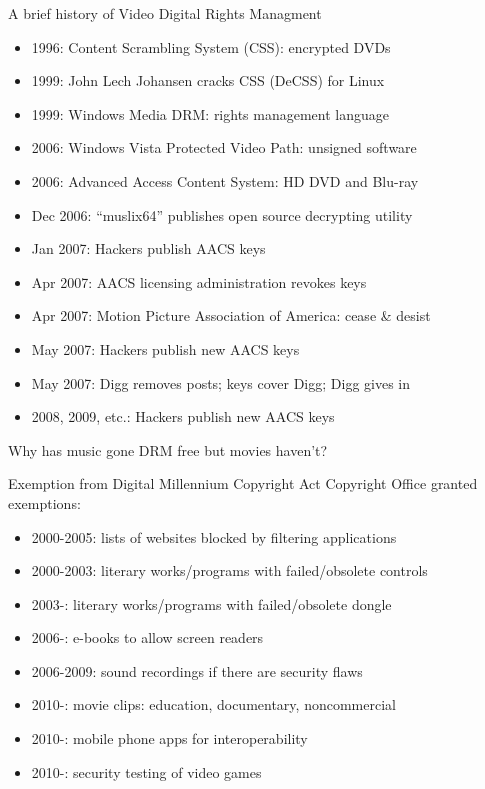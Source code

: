 \documentclass{beamer}
\begin{document}
\begin{frame}{A brief history of Video Digital Rights Managment}
\begin{itemize}
\item 1996: Content Scrambling System (CSS): encrypted DVDs
\item 1999: John Lech Johansen cracks CSS (DeCSS) for Linux
\item 1999: Windows Media DRM: rights management language
\item 2006: Windows Vista Protected Video Path: unsigned software
\item 2006: Advanced Access Content System: HD DVD and Blu-ray
\item Dec 2006: ``muslix64'' publishes open source decrypting utility
\item Jan 2007: Hackers publish AACS keys
\item Apr 2007: AACS licensing administration revokes keys
\item Apr 2007: Motion Picture Association of America: cease \& desist
\item May 2007: Hackers publish new AACS keys 
\item May 2007: Digg removes posts; keys cover Digg; Digg gives in
\item 2008, 2009, etc.: Hackers publish new AACS keys
\end{itemize}
\pause
\begin{center}
Why has music gone DRM free but movies haven't?
\end{center}
\end{frame}

\begin{frame}{Exemption from Digital Millennium Copyright Act}
Copyright Office granted exemptions:
\begin{itemize}
\item 2000-2005: lists of websites blocked by filtering applications
\item 2000-2003: literary works/programs with failed/obsolete controls
\item 2003-\the\year: literary works/programs with failed/obsolete dongle
\item 2006-\the\year: e-books to allow screen readers
\item 2006-2009: sound recordings if there are security flaws
\item 2010-\the\year: movie clips: education, documentary, noncommercial
\item 2010-\the\year: mobile phone apps for interoperability
\item 2010-\the\year: security testing of video games
\end{itemize}
\end{frame}
\end{document}
